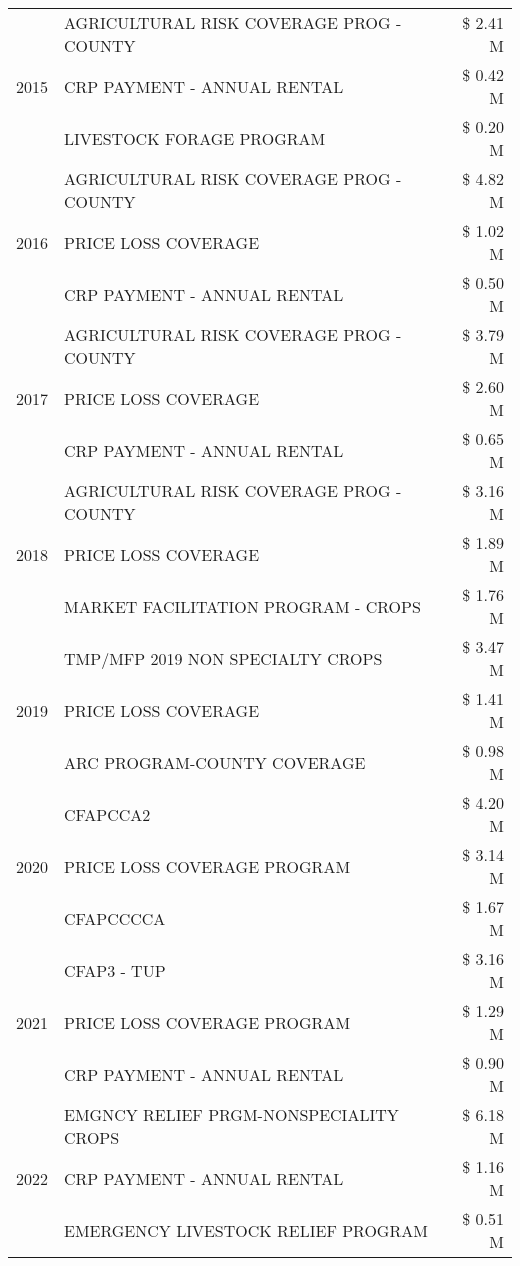 \begin{tabular}{llr}
\cline{1-3}
\multirow[t]{3}{*}{2015} & AGRICULTURAL RISK COVERAGE PROG - COUNTY & \$ 2.41 M \\
 & CRP PAYMENT - ANNUAL RENTAL & \$ 0.42 M \\
 & LIVESTOCK FORAGE PROGRAM & \$ 0.20 M \\
\cline{1-3}
\multirow[t]{3}{*}{2016} & AGRICULTURAL RISK COVERAGE PROG - COUNTY & \$ 4.82 M \\
 & PRICE LOSS COVERAGE & \$ 1.02 M \\
 & CRP PAYMENT - ANNUAL RENTAL & \$ 0.50 M \\
\cline{1-3}
\multirow[t]{3}{*}{2017} & AGRICULTURAL RISK COVERAGE PROG - COUNTY & \$ 3.79 M \\
 & PRICE LOSS COVERAGE & \$ 2.60 M \\
 & CRP PAYMENT - ANNUAL RENTAL & \$ 0.65 M \\
\cline{1-3}
\multirow[t]{3}{*}{2018} & AGRICULTURAL RISK COVERAGE PROG - COUNTY & \$ 3.16 M \\
 & PRICE LOSS COVERAGE & \$ 1.89 M \\
 & MARKET FACILITATION PROGRAM - CROPS & \$ 1.76 M \\
\cline{1-3}
\multirow[t]{3}{*}{2019} & TMP/MFP 2019 NON SPECIALTY CROPS & \$ 3.47 M \\
 & PRICE LOSS COVERAGE & \$ 1.41 M \\
 & ARC PROGRAM-COUNTY COVERAGE & \$ 0.98 M \\
\cline{1-3}
\multirow[t]{3}{*}{2020} & CFAPCCA2 & \$ 4.20 M \\
 & PRICE LOSS COVERAGE PROGRAM & \$ 3.14 M \\
 & CFAPCCCCA & \$ 1.67 M \\
\cline{1-3}
\multirow[t]{3}{*}{2021} & CFAP3 - TUP & \$ 3.16 M \\
 & PRICE LOSS COVERAGE PROGRAM & \$ 1.29 M \\
 & CRP PAYMENT - ANNUAL RENTAL & \$ 0.90 M \\
\cline{1-3}
\multirow[t]{3}{*}{2022} & EMGNCY RELIEF PRGM-NONSPECIALITY CROPS & \$ 6.18 M \\
 & CRP PAYMENT - ANNUAL RENTAL & \$ 1.16 M \\
 & EMERGENCY LIVESTOCK RELIEF PROGRAM & \$ 0.51 M \\
\cline{1-3}
\bottomrule
\end{tabular}
